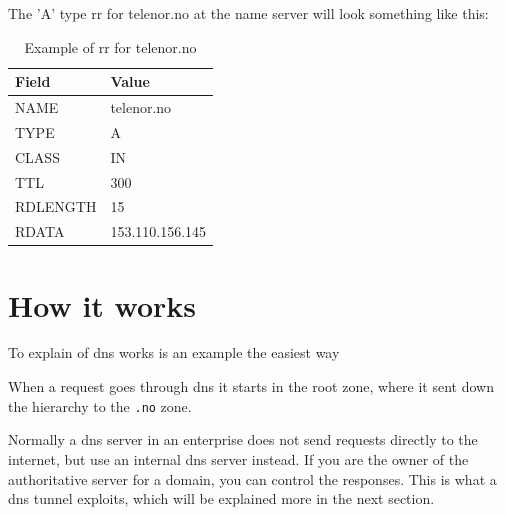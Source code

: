 The 'A' type \gls{rr} for telenor.no at the name server will look something like this:

\begin{table}
\centering
\begin{tabular}[c]{|l|l|}
\hline
\textbf{Field} & \textbf{Value} \\ \hline
NAME & telenor.no \\ \hline
TYPE & A \\ \hline
CLASS & IN \\ \hline
TTL & 300 \\ \hline
RDLENGTH & 15 \\ \hline
RDATA & 153.110.156.145 \\ \hline

\end{tabular}
\caption{\label{tab:rrexample}Example of \gls{rr} for telenor.no}
\end{table}


\section{How it works}
To explain of \Gls{dns} works is an example the easiest way

When a request goes through \Gls{dns} it starts in the root zone, where it sent down the hierarchy to the \texttt{.no} zone.



Normally a \Gls{dns} server in an enterprise does not send requests directly to the internet, but use an internal \Gls{dns} server instead. If you are the owner of the authoritative server for a domain, you can control the responses. This is what a \Gls{dns} tunnel exploits, which will be explained more in the next section. 





 